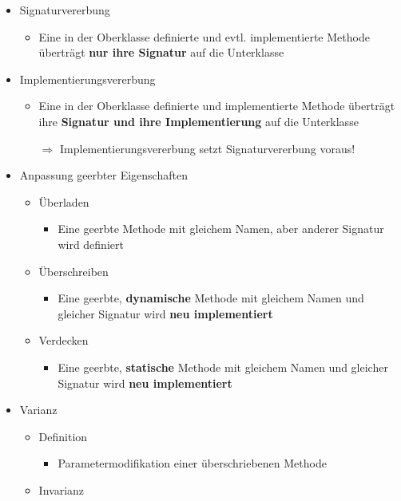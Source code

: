 			\begin{itemize}
				\item Signaturvererbung
				\begin{itemize}
					\item Eine in der Oberklasse definierte und evtl. implementierte Methode überträgt \textbf{nur ihre Signatur} auf die Unterklasse
				\end{itemize}
				\item Implementierungsvererbung
				\begin{itemize}
					\item Eine in der Oberklasse definierte und implementierte Methode überträgt ihre \textbf{Signatur und ihre Implementierung} auf die Unterklasse
									
					$\Rightarrow$ Implementierungsvererbung setzt Signaturvererbung voraus!
				\end{itemize}
				\item Anpassung geerbter Eigenschaften
				\begin{itemize}
					\item Überladen
					\begin{itemize}
						\item Eine geerbte Methode mit gleichem Namen, aber anderer Signatur wird definiert
					\end{itemize}
					\item Überschreiben
					\begin{itemize}
						\item Eine geerbte, \textbf{dynamische} Methode mit gleichem Namen und gleicher Signatur wird \textbf{neu implementiert}
					\end{itemize}
					\item Verdecken
					\begin{itemize}
						\item Eine geerbte, \textbf{statische} Methode mit gleichem Namen und gleicher Signatur wird \textbf{neu implementiert}
					\end{itemize}
				\end{itemize}
				\newpage
				\item Varianz
				\begin{itemize}
					\item Definition
					\begin{itemize}
						\item Parametermodifikation einer überschriebenen Methode
					\end{itemize}
					\item Invarianz

\end{itemize}
\end{itemize}
